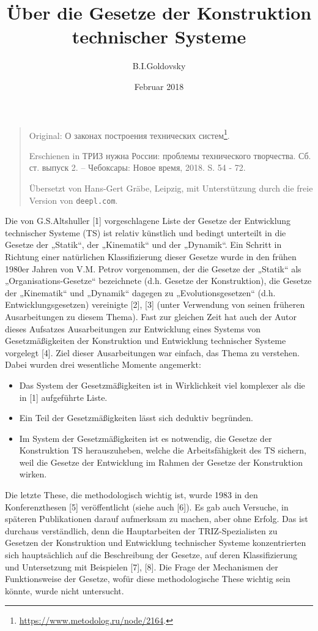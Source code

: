 \documentclass[11pt,a4paper]{article}
\title{Über die Gesetze der Konstruktion technischer Systeme }
\author{B.I.Goldovsky}
\date{Februar 2018}
\begin{document}
\maketitle
\begin{quote}
  Original: \foreignlanguage{russian}{О законах построения технических
    систем}\footnote{\url{https://www.metodolog.ru/node/2164}.}.

  Erschienen in \foreignlanguage{russian}{ТРИЗ нужна России: проблемы
    технического творчества. Сб. ст. выпуск 2. – Чебоксары: Новое время, 2018.}
  S. 54 - 72.
  
  Übersetzt von Hans-Gert Gräbe, Leipzig, mit Unterstützung durch die freie
  Version von \texttt{deepl.com}.
\end{quote}

Die von G.S.Altshuller [1] vorgeschlagene Liste der Gesetze der Entwicklung
technischer Systeme (TS) ist relativ künstlich und bedingt unterteilt in die
Gesetze der „Statik“, der „Kinematik“ und der „Dynamik“. Ein Schritt in
Richtung einer natürlichen Klassifizierung dieser Gesetze wurde in den frühen
1980er Jahren von V.M. Petrov vorgenommen, der die Gesetze der „Statik“ als
„Organisations-Gesetze“ bezeichnete (d.h. Gesetze der Konstruktion), die
Gesetze der „Kinematik“ und „Dynamik“ dagegen zu „Evolutionsgesetzen“
(d.h. Entwicklungsgesetzen) vereinigte [2], [3] (unter Verwendung von seinen
früheren Ausarbeitungen zu diesem Thema). Fast zur gleichen Zeit hat auch der
Autor dieses Aufsatzes Ausarbeitungen zur Entwicklung eines Systems von
Gesetzmäßigkeiten der Konstruktion und Entwicklung technischer Systeme
vorgelegt [4]. Ziel dieser Ausarbeitungen war einfach, das Thema zu verstehen.
Dabei wurden drei wesentliche Momente angemerkt:
\begin{itemize}
\item Das System der Gesetzmäßigkeiten ist in Wirklichkeit viel komplexer als
  die in [1] aufgeführte Liste.
\item Ein Teil der Gesetzmäßigkeiten lässt sich deduktiv begründen.
\item Im System der Gesetzmäßigkeiten ist es notwendig, die Gesetze der
  Konstruktion TS herauszuheben, welche die Arbeitsfähigkeit des TS sichern,
  weil die Gesetze der Entwicklung im Rahmen der Gesetze der Konstruktion
  wirken.
\end{itemize}

Die letzte These, die methodologisch wichtig ist, wurde 1983 in den
Konferenzthesen [5] veröffent\-licht (siehe auch [6]). Es gab auch Versuche,
in späteren Publikationen darauf aufmerksam zu machen, aber ohne Erfolg. Das
ist durchaus verständlich, denn die Hauptarbeiten der TRIZ-Spezialisten zu
Gesetzen der Konstruktion und Entwicklung technischer Systeme konzentrierten
sich hauptsächlich auf die Beschreibung der Gesetze, auf deren Klassifizierung
und Untersetzung mit Beispielen [7], [8]. Die Frage der Mechanismen der
Funktionsweise der Gesetze, wofür diese methodologische These wichtig sein
könnte, wurde nicht untersucht.
\end{document}
